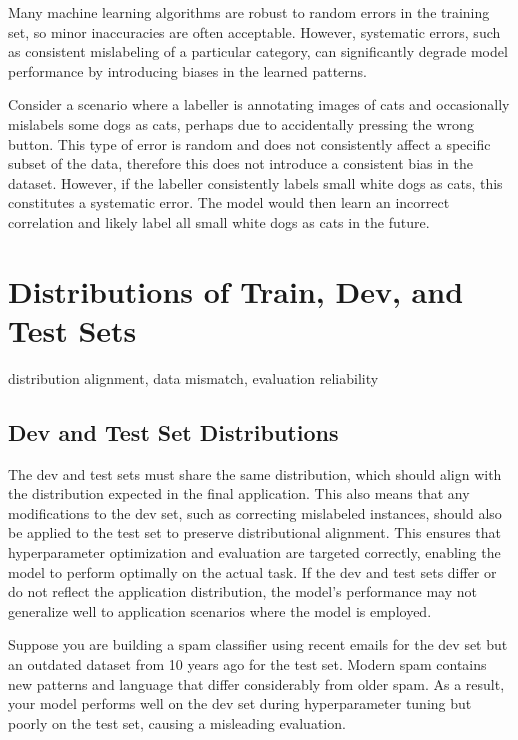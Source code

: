 \documentclass[12pt,openany, draft]{book}
\begin{document}
Many machine learning algorithms are robust to random errors in the training set, so minor inaccuracies are often acceptable. However, systematic errors, such as consistent mislabeling of a particular category, can significantly degrade model performance by introducing biases in the learned patterns. \newline

\begin{examplebox}
Consider a scenario where a labeller is annotating images of cats and occasionally mislabels some dogs as cats, perhaps due to accidentally pressing the wrong button. This type of error is random and does not consistently affect a specific subset of the data, therefore this does not introduce a consistent bias in the dataset. However, if the labeller consistently labels small white dogs as cats, this constitutes a systematic error. The model would then learn an incorrect correlation and likely label all small white dogs as cats in the future. 
\end{examplebox}



\section{Distributions of Train, Dev, and Test Sets}

\begin{keywordsbox}
distribution alignment, data mismatch, evaluation reliability
\end{keywordsbox}

\subsection{Dev and Test Set Distributions}
The dev and test sets must share the same distribution, which should align with the distribution expected in the final application. This also means that any modifications to the dev set, such as correcting mislabeled instances, should also be applied to the test set to preserve distributional alignment. This ensures that hyperparameter optimization and evaluation are targeted correctly, enabling the model to perform optimally on the actual task. If the dev and test sets differ or do not reflect the application distribution, the model's performance may not generalize well to application scenarios where the model is employed. \newline

\begin{examplebox}
Suppose you are building a spam classifier using recent emails for the dev set but an outdated dataset from 10 years ago for the test set. Modern spam contains new patterns and language that differ considerably from older spam. As a result, your model performs well on the dev set during hyperparameter tuning but poorly on the test set, causing a misleading evaluation.
\end{examplebox}
\end{document}
